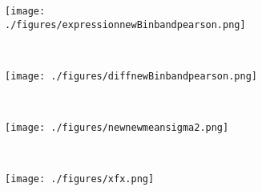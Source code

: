 \documentclass[11pt]{article}
\begin{document}
\begin{figure}[th!]
	\begin{subfigure}[b]{0.5\textwidth}
		\texttt{[image: ./figures/expressionnewBinbandpearson.png]}
		\caption{}
		\label{fig:binpearson}
		\hfill
	\end{subfigure}~
	\begin{subfigure}[b]{0.5\textwidth}
		\texttt{[image: ./figures/diffnewBinbandpearson.png]}
		\caption{}
		\label{fig:bandpearson}
	\end{subfigure}\\
	\begin{subfigure}[b]{0.45\textwidth}
		\texttt{[image: ./figures/newnewmeansigma2.png]}
		\caption{}
		\label{fig:m}
	\end{subfigure}~
\begin{subfigure}[b]{0.45\textwidth}
		\texttt{[image: ./figures/xfx.png]}
		\caption{}
		\label{fig:meanvar}
	\end{subfigure}\\


\end{figure}
\end{document}
